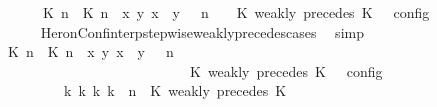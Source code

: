 \begin{isabellebody}
\ \ \ \ \ \ \ \ {\isasymlbrakk}\ {\isacharparenleft}{\isacharparenleft}{\isasymlceil}{\isacharhash}\isactrlsup {\isasymle}\ K\ n{\isacharcomma}\ {\isacharhash}\isactrlsup {\isasymle}\ K\ n{\isasymrceil}\ {\isasymin}\ {\isacharparenleft}{\isasymlambda}{\isacharparenleft}x{\isacharcomma}\ y{\isacharparenright}{\isachardot}\ x\ {\isasymle}\ y{\isacharparenright}{\isacharparenright}\ {\isacharhash}\ {\isasymGamma}{\isacharparenright}{\isacharcomma}\ n\ {\isasymturnstile}\ {\isasymPsi}\ {\isasymtriangleright}\ {\isacharparenleft}{\isacharparenleft}K\ weakly\ precedes\ K\ {\isacharhash}\ {\isasymPhi}{\isacharparenright}\ {\isasymrbrakk}\isactrlsub c\isactrlsub o\isactrlsub n\isactrlsub f\isactrlsub i\isactrlsub g{\isacartoucheclose}\isanewline
\ \ \ \ \ \ \ \ \isamarkupfalse%
\ HeronConf{\isacharunderscore}interp{\isacharunderscore}stepwise{\isacharunderscore}weakly{\isacharunderscore}precedes{\isacharunderscore}cases\ \isamarkupfalse%
\ simp\isanewline
\ \ \ \ \ \ \isamarkupfalse%
\ \isamarkupfalse%
\ {\isacartoucheopen}{\isasymrho}\ {\isasymin}\ {\isasymlbrakk}\ {\isacharparenleft}{\isacharparenleft}{\isasymlceil}{\isacharhash}\isactrlsup {\isasymle}\ K\ n{\isacharcomma}\ {\isacharhash}\isactrlsup {\isasymle}\ K\ n{\isasymrceil}\ {\isasymin}\ {\isacharparenleft}{\isasymlambda}{\isacharparenleft}x{\isacharcomma}\ y{\isacharparenright}{\isachardot}\ x\ {\isasymle}\ y{\isacharparenright}{\isacharparenright}\ {\isacharhash}\ {\isasymGamma}{\isacharparenright}{\isacharcomma}\ n\isanewline
\ \ \ \ \ \ \ \ \ \ \ \ \ \ \ \ \ \ \ \ \ \ \ \ \ \ \ \ {\isasymturnstile}\ {\isasymPsi}\ {\isasymtriangleright}\ {\isacharparenleft}{\isacharparenleft}K\ weakly\ precedes\ K\ {\isacharhash}\ {\isasymPhi}{\isacharparenright}\ {\isasymrbrakk}\isactrlsub c\isactrlsub o\isactrlsub n\isactrlsub f\isactrlsub i\isactrlsub g\isanewline
\ \ \ \ \ \ \ \ \ \ \ \ {\isasymLongrightarrow}\ {\isacharparenleft}{\isasymexists}{\isasymGamma}\isactrlsub k\ {\isasymPsi}\isactrlsub k\ {\isasymPhi}\isactrlsub k\ k{\isachardot}\ {\isacharparenleft}{\isacharparenleft}{\isasymGamma}{\isacharcomma}\ n\ {\isasymturnstile}\ {\isacharparenleft}{\isacharparenleft}K\ weakly\ precedes\ K\ {\isacharhash}\ {\isasymPsi}{\isacharparenright}\ {\isasymtriangleright}\ {\isasymPhi}{\isacharparenright}\isanewline

\end{isabellebody}

